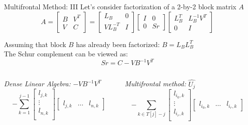 \begin{frame}[t]{Multifrontal Method: III}
	\small
	\justifying
	Let's consider factorization of a 2-by-2 block matrix $A$
	\begin{equation} \label{eq:mm-3}
		A = \begin{bmatrix}
		B & V^{T} \\
		V & C
		\end{bmatrix} 
		= 
		\begin{bmatrix}
		L_{B} & 0 \\
		VL^{-T}_{B} & I
		\end{bmatrix}
		\begin{bmatrix}
		I & 0 \\
		0 & Sr
		\end{bmatrix} 
		\begin{bmatrix}
		L^{T}_{B} & L^{-1}_{B}V^{T} \\
		0 & I
		\end{bmatrix} 
	\end{equation}
	
	Assuming that block $B$ has already been factorized: $B = L_{B}L^{T}_{B}$\\
	
	\vspace{5mm}
	The Schur complement can be viewed as:
	\begin{equation} \label{eq:mm-3}
	Sr =  C - VB^{-1}V^{T}
	\end{equation}
	
	\begin{columns}
		\begin{column}{0.5\textwidth}
			\textit{Dense Linear Algebra:} $-VB^{-1}V^{T}$\\
			\begin{equation} \label{eq:mm-5}
				-\sum_{k=1}^{j-1}  \begin{bmatrix}
				l_{j,k} \\
				\vdots \\
				l_{n,k} \\
				\end{bmatrix} \begin{bmatrix}
				l_{j,k} & \dots & l_{n,k}
				\end{bmatrix} 
			\end{equation}
		\end{column}
	
		\begin{column}{0.5\textwidth}
			\textit{Multifrontal method:} $\hat{U_{j}}$\\
			\begin{equation} \label{eq:mm-2}
				-\sum_{k \in T[j] -{j}}  \begin{bmatrix}
				l_{i_0,k} \\
				\vdots \\
				l_{i_r,k} \\
				\end{bmatrix} \begin{bmatrix}
				l_{i_0,k} & \dots & l_{i_r,k}
				\end{bmatrix} 
			\end{equation}
		\end{column}
	\end{columns}
	

\end{frame}
